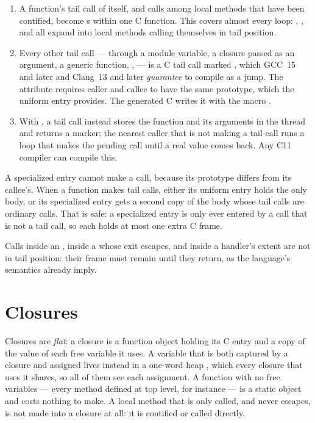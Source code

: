 \begin{enumerate}
\item A function's tail call of itself, and calls among local methods
  that have been contified, become s within one C function.
  This covers almost every loop: , ,
   and  all expand into local methods
  calling themselves in tail position.
\item Every other tail call --- through a module variable, a closure
  passed as an argument, a generic function, ,
   --- is a C tail call marked
  , which GCC~15 and later and
  Clang~13 and later \emph{guarantee} to compile as a jump. The
  attribute requires caller and callee to have the same prototype, which
  the uniform entry provides. The generated C writes it with the macro
  .
\item With , a tail call instead stores the function
  and its arguments in the thread and returns a marker; the nearest
  caller that is not making a tail call runs a loop that makes the
  pending call until a real value comes back. Any C11 compiler can
  compile this.
\end{enumerate}

A specialized entry cannot make a  call, because its
prototype differs from its callee's. When a function makes tail calls,
either its uniform entry holds the only body, or its specialized entry
gets a second copy of the body whose tail calls are ordinary calls. That
is safe: a specialized entry is only ever entered by a call that is not
a tail call, so each holds at most one extra C frame.

Calls inside an , inside a  whose
exit escapes, and inside a handler's extent are not in tail position:
their frame must remain until they return, as the language's semantics
already imply.

\section{Closures}\label{sec:internals-closures}

Closures are \emph{flat}: a closure is a function object holding its C
entry and a copy of the value of each free variable it uses. A variable
that is both captured by a closure and assigned lives instead in a
one-word heap , which every closure that uses it shares, so
all of them see each assignment. A function with no free variables ---
every method defined at top level, for instance --- is a static object
and costs nothing to make. A local method that is only called, and never
escapes, is not made into a closure at all: it is contified or called
directly.

